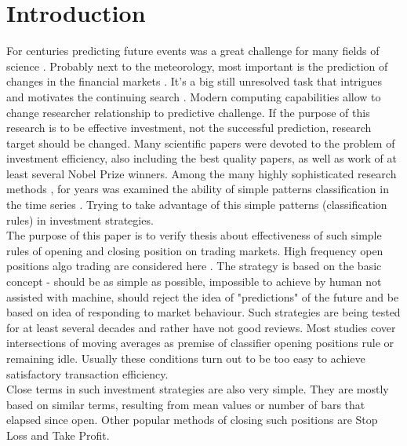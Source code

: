\documentclass{tewiart}
\begin{document}
\section{Introduction}
\indent For centuries predicting future events was a great challenge for many fields of science \cite{ball07, wu12}. Probably next to the meteorology, most important is the prediction of changes in the financial markets \cite{krutsinger99, satchwell05, schwager02}. It's a big still unresolved task that intrigues and motivates the continuing search \cite{fama91, fama98}. Modern computing capabilities allow to change researcher relationship to predictive challenge. If the purpose of this research is to be effective investment, not the successful prediction, research target should be changed. Many scientific papers were devoted to the problem of investment efficiency, also including the best quality papers, as well as work of at least several Nobel Prize winners. Among the many highly sophisticated research methods \cite{fujimoto03, kompa08, pawlak02, pedrycz97, rua09, raghuraj09, wilinski09}, for years was examined the ability of simple patterns classification in the time series \cite{brock92, cai05, gencay99, lebaron99, satchwell05}. Trying to take advantage of this simple patterns (classification rules) in investment strategies.\\
\indent The purpose of this paper is to verify thesis about effectiveness of such simple rules of opening and closing position on trading markets. High frequency open positions algo trading are considered here \cite{muriel04}. The strategy is based on the basic concept - should be as simple as possible, impossible to achieve by human not assisted with machine, should reject the idea of "predictions" of the future and be based on idea of responding to market behaviour. Such strategies are being tested for at least several decades and rather have not good reviews. Most studies cover intersections of moving averages as premise of classifier opening positions rule or remaining idle. Usually these conditions turn out to be too easy to achieve satisfactory transaction efficiency.\\
\indent Close terms in such investment strategies are also very simple. They are mostly based on similar terms, resulting from mean values or number of bars that elapsed since open. Other popular methods of closing such positions are Stop Loss and Take Profit.
\end{document}
